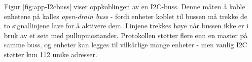 Figur \ref{fig:app-I2cbuss} viser oppkoblingen av en I2C-buss. Denne måten å koble enhetene på kalles \textit{open-drain buss} - fordi enheter koblet til bussen må trekke de to signallinjene lave for å aktivere dem. Linjene trekkes høye når bussen ikke er i bruk av et sett med pullupmostander. Protokollen støtter flere enn en master på samme buss, og enheter kan legges til vilkårlige mange enheter - men vanlig I2C støtter kun 112 unike adresser.
\begin{figure}[ht]
    \centering
    


\resizebox{.65\textwidth}{!}{\begin{tikzpicture}[x=0.75pt,y=0.75pt,yscale=-1,xscale=1]


\end{tikzpicture}}
\end{figure}
